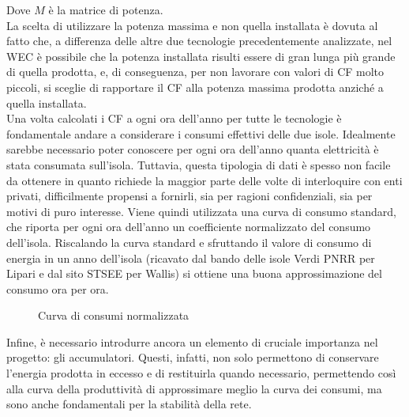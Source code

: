 \documentclass[fleqn,10pt]{SelfArx} %
\begin{document}
Dove $M$ è la matrice di potenza.\\ 
La scelta di utilizzare la potenza massima e non quella installata è dovuta al fatto che, a differenza delle altre due tecnologie precedentemente analizzate, nel WEC è possibile che la potenza installata risulti essere di gran lunga più grande di quella prodotta, e, di conseguenza, per non lavorare con valori di CF molto piccoli, si sceglie di rapportare il CF alla potenza massima prodotta anziché a quella installata. \\
Una volta calcolati i CF a ogni ora dell'anno per tutte le tecnologie è fondamentale andare a considerare i consumi effettivi delle due isole.
Idealmente sarebbe necessario poter conoscere per ogni ora dell'anno quanta elettricità è stata consumata sull'isola. Tuttavia, questa tipologia di dati è spesso non facile da ottenere in quanto richiede la maggior parte delle volte di interloquire con enti privati, difficilmente propensi a fornirli, sia per ragioni confidenziali, sia per motivi di puro interesse.
Viene quindi utilizzata una curva di consumo standard, che riporta per ogni ora dell'anno un coefficiente normalizzato del consumo dell'isola. Riscalando la curva standard e sfruttando il valore di consumo di energia in un anno dell'isola (ricavato dal bando delle isole Verdi PNRR per Lipari e dal sito STSEE per Wallis) si ottiene una buona approssimazione del consumo ora per ora. \\
\begin{figure*}[ht]\centering
	\caption{Curva di consumi normalizzata}
	\label{fig:consumption}
\end{figure*}
Infine, è necessario introdurre ancora un elemento di cruciale importanza nel progetto: gli accumulatori. 
Questi, infatti, non solo permettono di conservare l'energia prodotta in eccesso e di restituirla quando necessario, permettendo così alla curva della produttività di approssimare meglio la curva dei consumi, ma sono anche fondamentali per la stabilità della rete.
\end{document}
